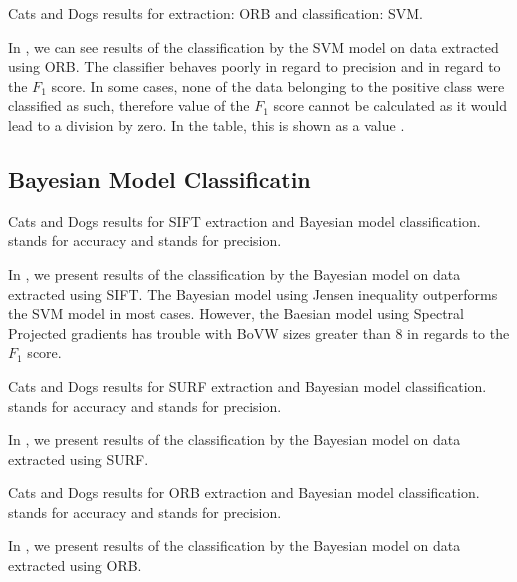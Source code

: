 \begin{table}[ht!]
    \centering
    
    \caption[Cats and Dogs results for extraction: ORB and classification: SVM]{Cats and Dogs results for extraction: ORB and classification: SVM.}
    \label{tab:iiit_ORB_SVM}
\end{table}
In , we can see results of the classification by the SVM model on data extracted using ORB. The classifier behaves poorly in regard to precision and in regard to the $F_1$ score. In some cases, none of the data belonging to the positive class were classified as such, therefore value of the $F_1$ score cannot be calculated as it would lead to a division by zero. In the table, this is shown as a value .

\subsection{Bayesian Model Classificatin}
\begin{table}[ht!]
    \centering
    
    \caption[Cats and Dogs results for SIFT extraction and Bayesian model classification]{Cats and Dogs results for SIFT extraction and Bayesian model classification.  stands for accuracy and  stands for precision.}
    \label{tab:iiit_SIFT_bayes}
\end{table}
In , we present results of the classification by the Bayesian model on data extracted using SIFT. The Bayesian model using Jensen inequality outperforms the SVM model in most cases. However, the Baesian model using Spectral Projected gradients has trouble with BoVW sizes greater than $8$ in regards to the $F_1$ score.

\begin{table}[ht!]
    \centering
    
    \caption[Cats and Dogs results for SURF extraction and Bayesian model classification]{Cats and Dogs results for SURF extraction and Bayesian model classification.  stands for accuracy and  stands for precision.}
    \label{tab:iiit_SURF_bayes}
\end{table}
In , we present results of the classification by the Bayesian model on data extracted using SURF.

\begin{table}[ht!]
    \centering
    
    \caption[Cats and Dogs results for ORB extraction and Bayesian model classification]{Cats and Dogs results for ORB extraction and Bayesian model classification.  stands for accuracy and  stands for precision.}
    \label{tab:iiit_ORB_bayes}
\end{table}
In , we present results of the classification by the Bayesian model on data extracted using ORB.
